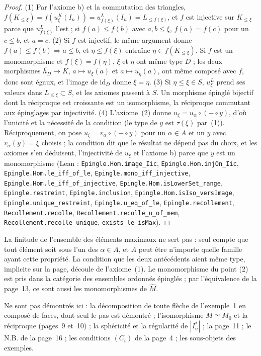 \begin{proof}
(1) Par l'axiome b) et la commutation des triangles, $f(K_{\leq \xi}) = f(u^K_\xi(I_n)) = u^L_{f(\xi)}(I_n) = L_{\leq f(\xi)}$, et $f$ est injective sur $K_{\leq \xi}$ parce que $u^L_{f(\xi)}$ l'est ; si $f(a) \leq f(b)$ avec $a, b \leq \xi$, $f(a) = f(c)$ pour un $c \leq b$, et $a = c$. (2) Si $f$ est injectif, le même argument donne $f(a) \leq f(b) \Rightarrow a \leq b$, et $\eta \leq f(\xi)$ entraîne $\eta \in f(K_{\leq \xi})$. Si $f$ est un monomorphisme et $f(\xi) = f(\eta)$, $\xi$ et $\eta$ ont même type $D$ ; les deux morphismes $\widetilde{h_D} \to K$, $a \mapsto u_\xi(a)$ et $a \mapsto u_\eta(a)$, ont même composé avec $f$, donc sont égaux, et l'image de $\mathrm{id}_D$ donne $\xi = \eta$. (3) Si $\eta \leq \xi \in S$, $u^L_\xi$ prend ses valeurs dans $L_{\leq \xi} \subset S$, et les axiomes passent à $S$. Un morphisme épinglé bijectif dont la réciproque est croissante est un isomorphisme, la réciproque commutant aux épinglages par injectivité. (4) L'axiome~(2) donne $u_\xi = u_\alpha \circ (- \circ y)$, d'où l'unicité et la nécessité de la condition (le type de $y$ est $\tau(\xi)$ par~(1)). Réciproquement, on pose $u_\xi = v_\alpha \circ (- \circ y)$ pour un $\alpha \in A$ et un $y$ avec $v_\alpha(y) = \xi$ choisis ; la condition dit que le résultat ne dépend pas du choix, et les axiomes s'en déduisent, l'injectivité de $u_\xi$ et l'axiome b) parce que $y$ est un monomorphisme (Lean : \texttt{Epingle.\allowbreak{}Hom.\allowbreak{}image\_Iic}, \texttt{Epingle.\allowbreak{}Hom.\allowbreak{}injOn\_Iic}, \texttt{Epingle.\allowbreak{}Hom.\allowbreak{}le\_iff\_of\_le}, \texttt{Epingle.\allowbreak{}mono\_iff\_injective}, \texttt{Epingle.\allowbreak{}Hom.\allowbreak{}le\_iff\_of\_injective}, \texttt{Epingle.\allowbreak{}Hom.\allowbreak{}isLowerSet\_range}, \texttt{Epingle.\allowbreak{}restreint}, \texttt{Epingle.\allowbreak{}inclusion}, \texttt{Epingle.\allowbreak{}Hom.\allowbreak{}isIso\_versImage}, \texttt{Epingle.\allowbreak{}unique\_restreint}, \texttt{Epingle.\allowbreak{}u\_eq\_of\_le}, \texttt{Epingle.\allowbreak{}recollement}, \texttt{Recollement.\allowbreak{}recolle}, \texttt{Recollement.\allowbreak{}recolle\_u\_of\_mem}, \texttt{Recollement.\allowbreak{}recolle\_unique}, \texttt{exists\_le\_isMax}).
\end{proof}

\begin{remarque}
La finitude de l'ensemble des éléments maximaux ne sert pas : seul compte que tout élément soit sous l'un des $\alpha \in A$, et $A$ peut être n'importe quelle famille ayant cette propriété. La condition que les deux antécédents aient même type, implicite sur la page, découle de l'axiome~(1). Le monomorphisme du point (2) est pris dans la catégorie des ensembles ordonnés épinglés ; par l'équivalence de la page~13, ce sont aussi les monomorphismes de $\widehat M$.
\end{remarque}

Ne sont pas démontrés ici : la décomposition de toute flèche de l'exemple~1 en composé de faces, dont seul le pas est démontré ; l'isomorphisme $M \simeq M_0$ et la réciproque (pages~9 et~10) ; la sphéricité et la régularité de $|I_n^*|$ ; la page~11 ; le N.B. de la page~16 ; les conditions $(C_i)$ de la page~4 ; les sous-objets des exemples.
